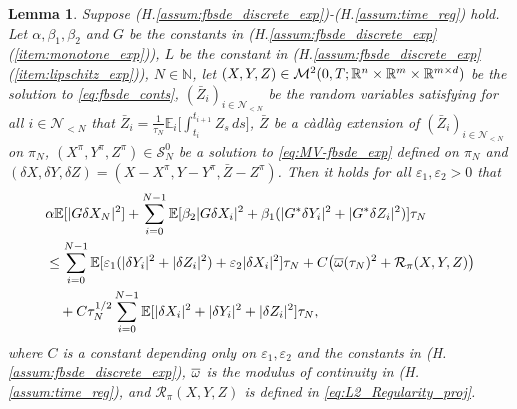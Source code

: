 \documentclass[11pt]{article}
\numberwithin{equation}{section}
\newtheorem{Lemma}[Theorem]{Lemma}
\theoremstyle{definition}
\theoremstyle{remark}
\def\ol{\overline} \def\cl{\centerline}   \def\ul{\underline}
\def\l{\label}  \def\f{\frac}  \def\fa{\forall}
\def\b{\beta}  \def\a{\alpha} \def\ga{\gamma}
\def\eps{\varepsilon}
\def\cM{\mathcal{M}}
\def\cN{\mathcal{N}}
\def\cR{\mathcal{R}}
\def\cS{\mathcal{S}}
\def\sE{{\mathbb{E}}}
\def\sN{{\mathbb{N}}}
\def\sR{{\mathbb R}}
\begin{document}
\begin{Lemma}\l{lemma:a_prior_time_error}
Suppose (H.\ref{assum:fbsde_discrete_exp})-(H.\ref{assum:time_reg}) hold.
Let 
 $\a,\b_1,\b_2$ and $G$ be the constants
 in (H.\ref{assum:fbsde_discrete_exp}(\ref{item:monotone_exp})),
 $L$ be the constant
 in (H.\ref{assum:fbsde_discrete_exp}(\ref{item:lipschitz_exp})),
 $N\in \sN$, 
 let 
$(X,Y, Z)\in \cM^2(0,T;\sR^n\t \sR^m\t \sR^{m\t d })$ be the solution to \eqref{eq:fbsde_conts},
$(\bar{Z}_i)_{i\in \cN_{<N}}$ be the random variables 
satisfying for all $i\in \cN_{<N}$ that 
$\bar{Z}_i=\frac{1}{\tau_N}\sE_i\big[\int_{t_i}^{t_{i+1}} Z_s\, ds\big]$,
$\bar{Z}$ be a c\`{a}dl\`{a}g extension of $(\bar{Z}_i)_{i\in \cN_{<N}}$ on $\pi_N$,
$(X^\pi,Y^\pi, Z^\pi)\in \cS^0_N$
be a solution to  \eqref{eq:MV-fbsde_exp} defined on $\pi_N$
and
 $(\delta X,\delta Y, \delta Z)= ( X-{X}^\pi, Y-{Y}^\pi, \bar{Z}-{Z}^\pi)$.
Then 
it holds for all $\eps_1,\eps_2>0$
that
\begin{align*}
&
\a \sE[|G \delta X_N|^2]+
\sum_{i=0}^{N-1}
\sE[
\beta_2|G\delta X_{i}|^2
+
\beta_1(
|G^*\delta Y_{i}|^2+|G^*\delta {Z}_i|^2)
 ]\tau_N
\\
& \le
\sum_{i=0}^{N-1}
\sE[
\eps_1(|\delta Y_{i}|^2+|\delta Z_{i}|^2)
+\eps_2|\delta X_{i}|^2
]\tau_N
+
C\big(\ol{\om}(\tau_N)^2
+
\cR_\pi(X,Y,Z)
\big)
\\
&\quad +
C\tau_N^{1/2}
\sum_{i=0}^{N-1}
\sE[
|\delta X_{i}|^2+|\delta Y_{i}|^2+|\delta Z_{i}|^2
]\tau_N,
\end{align*}
where 
$C$ is a constant depending only on $\eps_1,\eps_2$ and the constants in  (H.\ref{assum:fbsde_discrete_exp}),
$\ol{\om}$ is the modulus of continuity in (H.\ref{assum:time_reg}),
and $\cR_\pi(X,Y,Z)$ is  defined  in \eqref{eq:L2_Regularity_proj}.


\end{Lemma}
\end{document}
